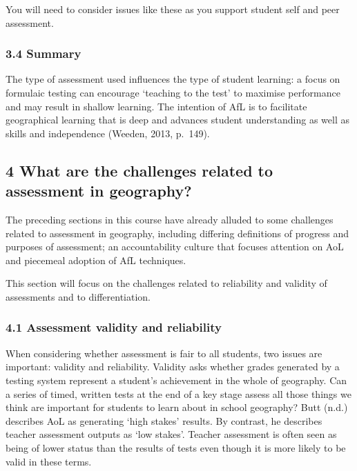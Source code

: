 \documentclass[letterpaper,10pt,english]{sphinxmanual}
\begin{document}
You will need to consider issues like these as you support student self and peer assessment.


\subsubsection{3.4 Summary}
\label{\detokenize{content/session_00/Part_00_03:3.4-Summary}}
The type of assessment used influences the type of student learning: a focus on formulaic testing can encourage ‘teaching to the test’ to maximise performance and may result in shallow learning. The intention of AfL is to facilitate geographical learning that is deep and advances student understanding as well as skills and independence (Weeden, 2013, p. 149).


\subsection{4 What are the challenges related to assessment in geography?}
\label{\detokenize{content/session_00/Part_00_04:4-What-are-the-challenges-related-to-assessment-in-geography?}}\label{\detokenize{content/session_00/Part_00_04::doc}}
The preceding sections in this course have already alluded to some challenges related to assessment in geography, including differing definitions of progress and purposes of assessment; an accountability culture that focuses attention on AoL and piecemeal adoption of AfL techniques.

This section will focus on the challenges related to reliability and validity of assessments and to differentiation.


\subsubsection{4.1 Assessment validity and reliability}
\label{\detokenize{content/session_00/Part_00_04:4.1-Assessment-validity-and-reliability}}
When considering whether assessment is fair to all students, two issues are important: validity and reliability. Validity asks whether grades generated by a testing system represent a student’s achievement in the whole of geography. Can a series of timed, written tests at the end of a key stage assess all those things we think are important for students to learn about in school geography? Butt (n.d.) describes AoL as generating ‘high stakes’ results. By contrast, he describes teacher assessment
outputs as ‘low stakes’. Teacher assessment is often seen as being of lower status than the results of tests even though it is more likely to be valid in these terms.
\end{document}

